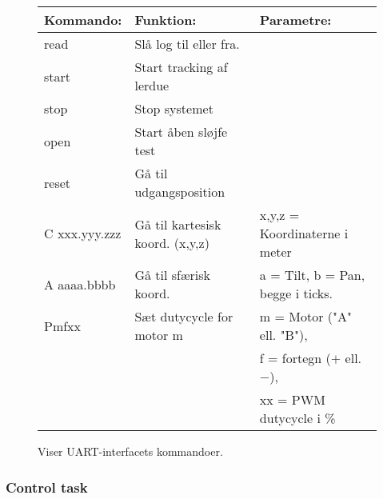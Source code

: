 \begin{figure}[th!]
\centering
\begin{tabular}{l|l|l}
Kommando: & Funktion: & Parametre: \\\hline 
read & Slå log til eller fra.  &   \\\hline 
start & Start tracking af lerdue &   \\\hline 
stop & Stop systemet &   \\\hline 
open & Start åben sløjfe test &  \\\hline  
reset & Gå til udgangsposition &   \\\hline 
C xxx.yyy.zzz & Gå til  kartesisk koord. (x,y,z) & x,y,z = Koordinaterne i meter \\\hline 
A aaaa.bbbb & Gå til sfærisk koord.  & a = Tilt, b = Pan, begge i ticks. \\\hline  
Pmfxx & Sæt dutycycle for motor m & m = Motor ("A" ell. "B"), \\ 
& & f = fortegn ($+$ ell. $-$),  \\
& & xx = PWM dutycycle i \%
\end{tabular} 
\captionsetup{type=table}
\caption{Viser UART-interfacets kommandoer.}
\label{tb:uart_interface}
\end{figure}



\subsubsection{Control task}
\label{sec:control_task}

